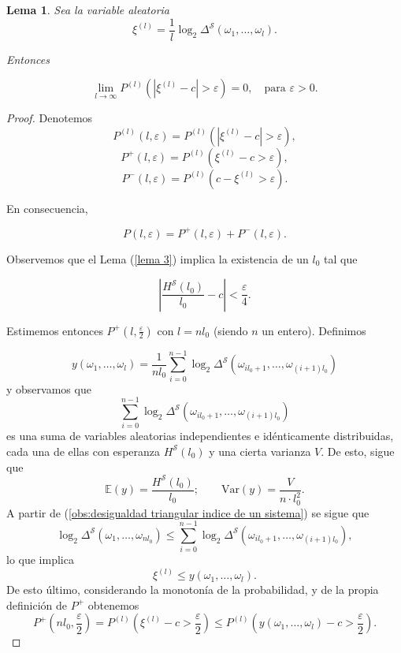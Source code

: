 \documentclass{report}
\newtheorem{lem}{Lema}[section]
\begin{document}
\bigskip
\begin{lem} \label{lema 4}
    Sea la variable aleatoria
    \[
        \xi^{(l)} = \frac{1}{l} \log_2 \Delta^{\mathcal{S}}(\omega_1, \dots, \omega_l).
    \]

    Entonces
    
    \[
    \lim_{l \to \infty} P^{(l)}(|\xi^{(l)} - c| > \varepsilon) = 0, \quad \text{para } \varepsilon > 0.
    \]
\end{lem}
\bigskip
\begin{proof}
    Denotemos 
    \[ P^{(l)}(l, \varepsilon) = P^{(l)}(|\xi^{(l)} - c| > \varepsilon) , \] 
    \[ P^+(l, \varepsilon) = P^{(l)}(\xi^{(l)} - c > \varepsilon) , \] 
    \[ P^-(l, \varepsilon) = P^{(l)}(c - \xi^{(l)} > \varepsilon) . \]

    En consecuencia,
    
    \[
    P(l, \varepsilon) = P^+(l, \varepsilon) + P^-(l, \varepsilon).
    \]
    
    Observemos que el Lema (\ref{lema 3}) implica la existencia de un \( l_0 \) tal que
    
    \begin{equation}\label{desigualdad 14}
    \left| \frac{H^{\mathcal{S}}(l_0)}{l_0} - c \right| < \frac{\varepsilon}{4}.
    \end{equation}
    
    Estimemos entonces \( P^+(l, \frac{\varepsilon}{2}) \) con \( l = nl_0 \) (siendo \( n \) un entero). Definimos
    
    \[
    y(\omega_1,\ldots,\omega_l) = \frac{1}{nl_0} \sum_{i=0}^{n-1} \log_2 \Delta^{\mathcal{S}}(\omega_{il_0+1}, \dots, \omega_{(i+1)l_0})
    \]
    y observamos que
    \[
    \sum_{i=0}^{n-1} \log_2 \Delta^{\mathcal{S}}(\omega_{il_0+1}, \dots, \omega_{(i+1)l_0})
    \]
    es una suma de variables aleatorias independientes e idénticamente distribuidas, cada una de ellas con esperanza \( H^{\mathcal{S}}(l_0) \)
    y una cierta varianza $V$. De esto, sigue que
    \[
    \mathbb{E}(y) = \frac{H^{\mathcal{S}}(l_0)}{l_0} ; \qquad \text{Var}(y) = \frac{V}{n \cdot l_0^2}.
    \]
    A partir de (\ref{obs:desigualdad triangular indice de un sistema}) se sigue que
    \[
    \log_2 \Delta^{\mathcal{S}}(\omega_1, \dots, \omega_{nl_0}) \leq \sum_{i=0}^{n-1} \log_2 \Delta^{\mathcal{S}}(\omega_{il_0+1}, \dots, \omega_{(i+1)l_0}),
    \]
    lo que implica
    \[
    \xi^{(l)} \leq y(\omega_1,\ldots,\omega_l).
    \]
    De esto último, considerando la monotonía de la probabilidad, y de la propia definición de $P^+$ obtenemos
    \begin{equation}\label{desigualdad 15} 
    P^+\left(nl_0, \frac{\varepsilon}{2}\right) = P^{(l)}\left(\xi^{(l)}-c>\frac{\varepsilon}{2}\right) \leq P^{(l)} \left(y(\omega_1,\ldots,\omega_l)-c > \frac{\varepsilon}{2}\right).
    \end{equation}


\end{proof}
\end{document}
